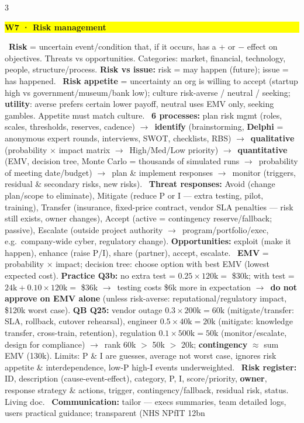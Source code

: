 \documentclass[a4paper,landscape]{article}
\newcommand{\hlhighlight}[1]{\begingroup\setlength{\fboxsep}{0pt}\colorbox{yellow}{\strut\textbf{#1}}\endgroup}
\newcommand{\concept}[1]{\textbf{#1}}
\newcommand{\lbl}[1]{\textbf{#1}}
\newcommand{\kh}[1]{{\setlength{\fboxsep}{0.5pt}\colorbox{keyhlcolor}{#1}}}
\newcommand{\ra}{$\rightarrow$}
\newcommand{\PTWO}{\fontsize{5.7pt}{6.05pt}\selectfont}
\begin{document}
\newpage
\begin{multicols}{3}
\PTWO

\par\smallskip\noindent\hlhighlight{W7 · Risk management}\ \concept{Risk} = \kh{uncertain event/condition} that, if it occurs, has a \kh{+ or $-$ effect} on objectives. Threats vs opportunities. Categories: market, financial, technology, people, structure/process. \lbl{Risk vs issue:} risk = may happen (future); issue = has happened. \textbullet\ \concept{Risk appetite} = uncertainty an org is willing to accept (startup high vs government/museum/bank low); culture risk-averse / neutral / seeking; \lbl{utility}: averse prefers certain lower payoff, neutral uses EMV only, seeking gambles. Appetite must match culture. \textbullet\ \concept{6 processes:} plan risk mgmt (roles, scales, thresholds, reserves, cadence) \ra\ \lbl{identify} (brainstorming, \lbl{Delphi} = anonymous expert rounds, interviews, SWOT, checklists, RBS) \ra\ \lbl{qualitative} (probability $\times$ impact matrix \ra\ High/Med/Low priority) \ra\ \lbl{quantitative} (EMV, decision tree, Monte Carlo = thousands of simulated runs \ra\ probability of meeting date/budget) \ra\ plan \& implement responses \ra\ monitor (triggers, residual \& secondary risks, new risks). \textbullet\ \concept{Threat responses:} \kh{Avoid} (change plan/scope to eliminate), \kh{Mitigate} (reduce P or I --- extra testing, pilot, training), \kh{Transfer} (insurance, fixed-price contract, vendor SLA penalties --- risk still exists, owner changes), \kh{Accept} (active = contingency reserve/fallback; passive), \kh{Escalate} (outside project authority \ra\ program/portfolio/exec, e.g.\ company-wide cyber, regulatory change). \concept{Opportunities:} exploit (make it happen), enhance (raise P/I), share (partner), accept, escalate. \textbullet\ \concept{EMV} = \kh{probability $\times$ impact}; decision tree: choose option with best EMV (lowest expected cost). \lbl{Practice Q3b:} no extra test = $0.25\times120\text{k}=$ \kh{\$30k}; with test = $24\text{k}+0.10\times120\text{k}=$ \kh{\$36k} \ra\ testing costs \$6k more in expectation \ra\ \lbl{do not approve on EMV alone} (unless risk-averse: reputational/regulatory impact, \$120k worst case). \lbl{QB Q25:} vendor outage $0.3\times200\text{k}=60\text{k}$ (mitigate/transfer: SLA, rollback, cutover rehearsal), engineer $0.5\times40\text{k}=20\text{k}$ (mitigate: knowledge transfer, cross-train, retention), regulation $0.1\times500\text{k}=50\text{k}$ (monitor/escalate, design for compliance) \ra\ rank 60k $>$ 50k $>$ 20k; \lbl{contingency} $\approx$ sum EMV (130k). Limits: P \& I are guesses, average not worst case, ignores risk appetite \& interdependence, low-P high-I events underweighted. \textbullet\ \concept{Risk register:} ID, description (cause-event-effect), category, P, I, score/priority, \lbl{owner}, response strategy \& actions, trigger, contingency/fallback, residual risk, status. Living doc. \textbullet\ \concept{Communication:} tailor --- execs summaries, team detailed logs, users practical guidance; transparent (NHS NPfIT \textsterling12bn 
\end{multicols}
\end{document}
